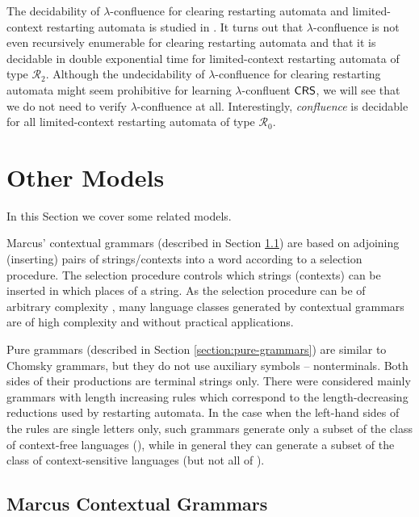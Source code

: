 The decidability of $\lambda$-confluence for clearing restarting automata and limited-context restarting automata is studied in \cite{OM13}. It turns out that $\lambda$-confluence is not even recursively enumerable for clearing restarting automata and that it is decidable in double exponential time for limited-context restarting automata of type $\mathcal{R}_2$. Although the undecidability of $\lambda$-confluence for clearing restarting automata might seem prohibitive for learning $\lambda$-confluent $\mbox{\sf CRS\/}$, we will see that we do not need to verify $\lambda$-confluence at all. Interestingly, \emph{confluence} is decidable for all limited-context restarting automata of type $\mathcal{R}_0$. 

\section{Other Models}
\label{section:other-models}

In this Section we cover some related models.

Marcus' contextual grammars (described in Section \ref{section:marcus-contextual-grammars}) are based on adjoining (inserting) pairs of strings/contexts into a word according to a selection procedure. The selection procedure controls which strings (contexts) can be inserted in which places of a string. As the selection procedure can be of arbitrary complexity \cite{Pa98}, many language classes generated by contextual grammars are of high complexity and without practical applications.

Pure grammars \cite{maurer1980pure} (described in Section \ref{section:pure-grammars}) are similar to Chomsky grammars, but they do not use auxiliary symbols -- nonterminals. Both sides of their productions are terminal strings only. There were considered mainly grammars with length increasing rules which correspond to the length-decreasing reductions used by restarting automata. In the case when the left-hand sides of the rules are single letters only, such grammars generate only a subset of the class of context-free languages (\CFL), while in general they can generate a subset of the class of context-sensitive languages (but not all of \CFL).

\subsection{Marcus Contextual Grammars}
\label{section:marcus-contextual-grammars}

